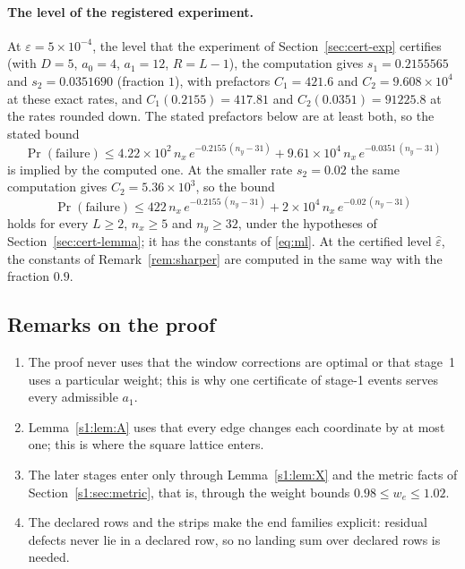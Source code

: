\documentclass[11pt]{amsart}
\theoremstyle{definition}
\theoremstyle{remark}
\numberwithin{equation}{section}
\newcommand{\eps}{\varepsilon}
\begin{document}
\paragraph{The level of the registered experiment.} At $\eps=5\times10^{-4}$, the level that the experiment of Section~\ref{sec:cert-exp} certifies (with $D=5$, $a_0=4$, $a_1=12$, $R=L-1$), the computation gives $s_1=0.2155565$ and $s_2=0.0351690$ (fraction $1$), with prefactors $C_1=421.6$ and $C_2=9.608\times10^{4}$ at these exact rates, and $C_1(0.2155)=417.81$ and $C_2(0.0351)=91225.8$ at the rates rounded down. The stated prefactors below are at least both, so the stated bound
\[
\Pr(\text{failure})\le4.22\times10^{2}\,n_x\,e^{-0.2155\,(n_y-31)}+9.61\times10^{4}\,n_x\,e^{-0.0351\,(n_y-31)}
\]
is implied by the computed one. At the smaller rate $s_2=0.02$ the same computation gives $C_2=5.36\times10^{3}$, so the bound
\[
\Pr(\text{failure})\le422\,n_x\,e^{-0.2155\,(n_y-31)}+2\times10^{4}\,n_x\,e^{-0.02\,(n_y-31)}
\]
holds for every $L\ge2$, $n_x\ge5$ and $n_y\ge32$, under the hypotheses of Section~\ref{sec:cert-lemma}; it has the constants of \eqref{eq:ml}. At the certified level $\hat\eps$, the constants of Remark~\ref{rem:sharper} are computed in the same way with the fraction $0.9$.

\subsection{Remarks on the proof}\label{s1:sec:remarks}
\begin{enumerate}[label=(\arabic*),leftmargin=2em]
\item The proof never uses that the window corrections are optimal or that stage~1 uses a particular weight; this is why one certificate of stage-1 events serves every admissible $a_1$.
\item Lemma~\ref{s1:lem:A} uses that every edge changes each coordinate by at most one; this is where the square lattice enters.
\item The later stages enter only through Lemma~\ref{s1:lem:X} and the metric facts of Section~\ref{s1:sec:metric}, that is, through the weight bounds $0.98\le w_e\le1.02$.
\item The declared rows and the strips make the end families explicit: residual defects never lie in a declared row, so no landing sum over declared rows is needed.
\end{enumerate}
\end{document}

